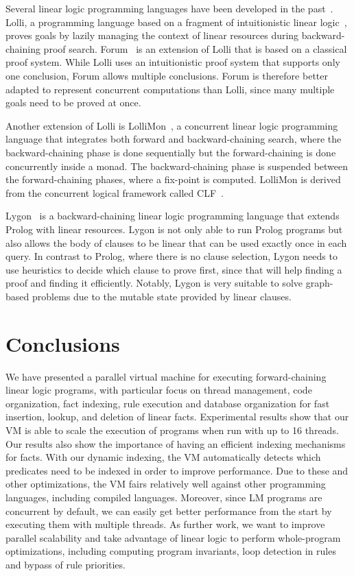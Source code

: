 \documentclass{sigplanconf}
\begin{document}
Several linear logic programming languages have been developed in the past~\cite{Miller85anoverview}.
Lolli, a programming language based on a fragment of intuitionistic linear logic~\cite{Hodas94logicprogramming}, 
proves goals by lazily managing the context of linear resources during backward-chaining proof search.
Forum~\cite{Miller94} is an extension of Lolli that is based on a classical proof system. While Lolli uses an intuitionistic proof system that supports only one conclusion, Forum allows multiple conclusions. Forum is therefore better adapted to represent concurrent computations than Lolli, since many multiple goals need to be proved at once.

Another extension of Lolli is LolliMon~\cite{Lopez:2005:MCL:1069774.1069778}, a concurrent linear logic programming language that integrates
both forward and backward-chaining search, where the backward-chaining phase is done sequentially but
the forward-chaining is done concurrently inside a monad. The backward-chaining phase is suspended
between the forward-chaining phases, where a fix-point is computed.
LolliMon is derived from the concurrent logical framework called CLF~\cite{Watkins:2004uq}.

Lygon~\cite{Harland96} is a backward-chaining linear logic programming language that extends Prolog with linear resources. Lygon is not only able to run Prolog programs but also allows the body of clauses to be linear that can be used exactly once in each query.
In contrast to Prolog, where there is no clause selection, Lygon needs to use heuristics to decide which clause to prove first, since that will help finding a proof and finding it efficiently. Notably, Lygon is very suitable to solve graph-based problems due to the mutable state provided by linear clauses.

\makeatletter{}\section{Conclusions}

We have presented a parallel virtual machine for executing
forward-chaining linear logic programs, with particular focus on
thread management, code organization, fact indexing, rule execution
and database organization for fast insertion, lookup, and deletion of
linear facts. Experimental results show that our VM is able to scale
the execution of programs when run with up to 16 threads.
Our results also show the importance of having an efficient indexing mechanisms
for facts. With our dynamic indexing, the VM automatically detects which predicates
need to be indexed in order to improve performance.
Due to these and other optimizations, the VM fairs relatively well against other programming languages, including
compiled languages. Moreover, since LM programs are
concurrent by default, we can easily get better performance from the
start by executing them with multiple threads.
As further work, we want to improve parallel scalability and
take advantage of linear logic to perform whole-program
optimizations, including computing program invariants, loop detection
in rules and bypass of rule priorities.
\end{document}
